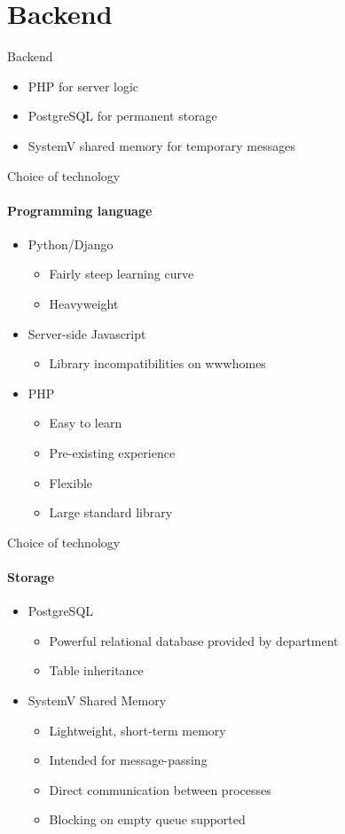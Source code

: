 \section{Backend}
\begin{frame}{Backend}
  \begin{itemize}
    \item PHP for server logic
    \item PostgreSQL for permanent storage
    \item SystemV shared memory for temporary messages
  \end{itemize}
\end{frame}

\begin{frame}{Choice of technology}
  \framesubtitle{Programming language}
  \begin{itemize}
    \item Python/Django
      \begin{itemize}
        \item Fairly steep learning curve
        \item Heavyweight
      \end{itemize}
    \pause
    \item Server-side Javascript
      \begin{itemize}
        \item Library incompatibilities on wwwhomes
      \end{itemize}
    \pause
    \item PHP
      \begin{itemize}
        \item Easy to learn
        \item Pre-existing experience
        \item Flexible
        \item Large standard library
      \end{itemize}
  \end{itemize}
\end{frame}

\begin{frame}{Choice of technology}
  \framesubtitle{Storage}
  \begin{itemize}
    \item PostgreSQL
      \begin{itemize}
        \item Powerful relational database provided by department
        \item Table inheritance 
      \end{itemize}
    \pause
    \item SystemV Shared Memory
      \begin{itemize}
        \item Lightweight, short-term memory
        \item Intended for message-passing
        \item Direct communication between processes
        \item Blocking on empty queue supported
      \end{itemize}
  \end{itemize}
\end{frame}

